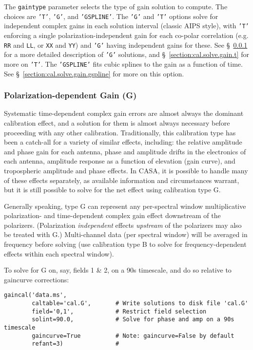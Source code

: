 {The {\tt gaintype} parameter selects the type of gain solution to
compute.  The choices are {\tt 'T'}, {\tt 'G'}, and {\tt 'GSPLINE'}.
The {\tt 'G'} and {\tt 'T'} options solve for independent complex
gains in each solution interval (classic AIPS style), with {\tt 'T'} 
enforcing a single polarization-independent gain for each co-polar
correlation (e.g. {\tt RR} and {\tt LL}, or {\tt XX} and {\tt YY})
and {\tt 'G'} having independent gains for these.  
See \S~\ref{section:cal.solve.gain.g} for a more detailed description
of {\tt 'G'} solutions, and \S~\ref{section:cal.solve.gain.t} for more
on {\tt 'T'}.  The {\tt 'GSPLINE'} fits cubic splines to the gain as
a function of time.  See \S~\ref{section:cal.solve.gain.gspline} for
more on this option.

\subsubsection{Polarization-dependent Gain (G)}
\label{section:cal.solve.gain.g}

Systematic time-dependent complex gain errors are almost always the
dominant calibration effect, and a solution for them is almost always
necessary before proceeding with any other calibration.
Traditionally, this calibration type has been a catch-all for a
variety of similar effects, including: the relative amplitude and
phase gain for each antenna, phase and amplitude drifts in the
electronics of each antenna, amplitude response as a function of
elevation (gain curve), and tropospheric amplitude and phase effects.
In CASA, it is possible to handle many of these effects separately, as
available information and circumstances warrant, but it is still
possible to solve for the net effect using calibration type G.

Generally speaking, type G can represent any per-spectral window
multiplicative polarization- and time-dependent complex gain effect
downstream of the polarizers.  (Polarization {\it independent} effects
{\it upstream} of the polarizers may also be treated with G.)
Multi-channel data (per spectral window) will be averaged in frequency
before solving (use calibration type B to solve for
frequency-dependent effects within each spectral window).

To solve for G on, say, fields 1 \& 2, on a 90s timescale, and do so
relative to gaincurve corrections:
\small
\begin{verbatim}
gaincal('data.ms',
        caltable='cal.G',       # Write solutions to disk file 'cal.G'
        field='0,1',            # Restrict field selection
        solint=90.0,            # Solve for phase and amp on a 90s timescale
        gaincurve=True          # Note: gaincurve=False by default
        refant=3)               #
			        

\end{verbatim}}
